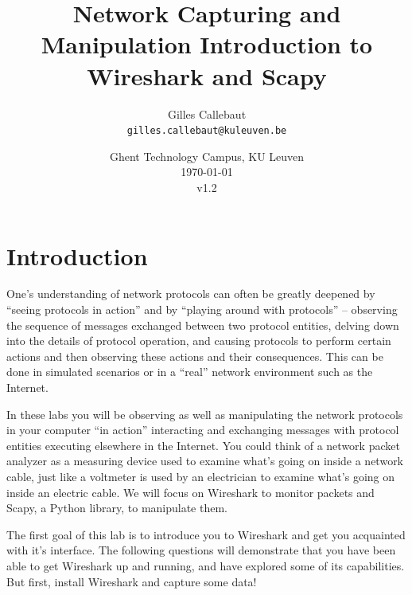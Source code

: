 \documentclass[11pt,a4paper]{article}
\title{Network Capturing and Manipulation Introduction to Wireshark and Scapy}
\author{Gilles Callebaut\\ \texttt{gilles.callebaut@kuleuven.be}}
\date{Ghent Technology Campus, KU Leuven\\ \today \\v1.2}
\begin{document}
 \sloppy

\maketitle

\begin{versionhistory}
\end{versionhistory}


\clearpage

\setcounter{tocdepth}{2}
\tableofcontents
\clearpage

\section{Introduction}
One's understanding of network protocols can often be greatly deepened by ``seeing
protocols in action'' and by ``playing around with protocols'' – observing the sequence of messages exchanged between two protocol entities, delving down into the details of protocol operation, and causing protocols to perform certain actions and then observing these actions and their consequences. This can be done in simulated scenarios or in a ``real'' network environment such as the Internet. 

In these labs you will be observing as well as manipulating the network protocols in your computer ``in action'' interacting and exchanging messages with protocol entities executing elsewhere in the Internet. 
You could think of a network packet analyzer as a measuring device used to examine what's going on inside a network cable, just like a voltmeter is used by an electrician to examine what's going on inside an electric cable. We will focus on Wireshark to monitor packets and Scapy, a Python library, to manipulate them. 

The first goal of this lab is to introduce you to Wireshark and get you acquainted with it's interface. The following questions will demonstrate that you have been able to get Wireshark up and running, and have explored some of its capabilities.
But first, install Wireshark and capture some data!
\end{document}
